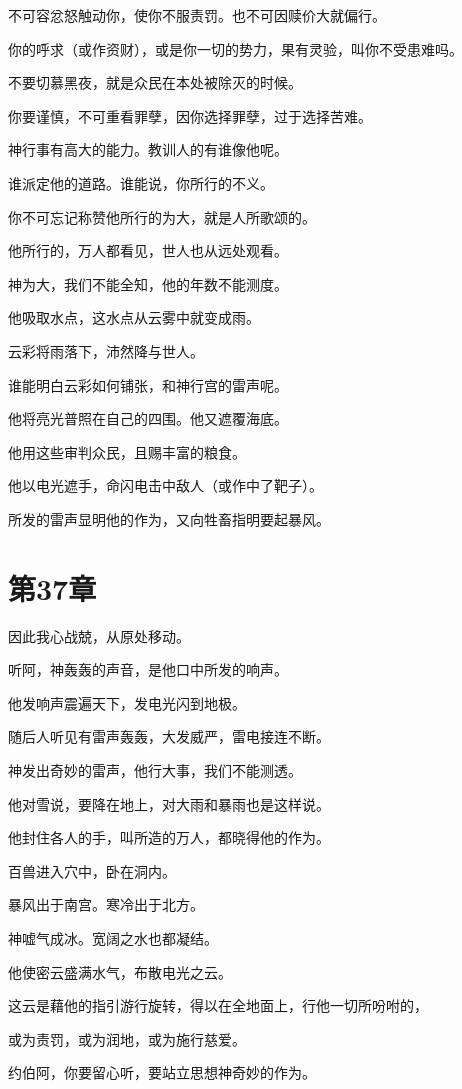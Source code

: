 \documentclass[12pt,oneside]{book}
\begin{document}
不可容忿怒触动你，使你不服责罚。也不可因赎价大就偏行。

你的呼求（或作资财），或是你一切的势力，果有灵验，叫你不受患难吗。

不要切慕黑夜，就是众民在本处被除灭的时候。

你要谨慎，不可重看罪孽，因你选择罪孽，过于选择苦难。

神行事有高大的能力。教训人的有谁像他呢。

谁派定他的道路。谁能说，你所行的不义。

你不可忘记称赞他所行的为大，就是人所歌颂的。

他所行的，万人都看见，世人也从远处观看。

神为大，我们不能全知，他的年数不能测度。

他吸取水点，这水点从云雾中就变成雨。

云彩将雨落下，沛然降与世人。

谁能明白云彩如何铺张，和神行宫的雷声呢。

他将亮光普照在自己的四围。他又遮覆海底。

他用这些审判众民，且赐丰富的粮食。

他以电光遮手，命闪电击中敌人（或作中了靶子）。

所发的雷声显明他的作为，又向牲畜指明要起暴风。


\chapter{第37章}
因此我心战兢，从原处移动。

听阿，神轰轰的声音，是他口中所发的响声。

他发响声震遍天下，发电光闪到地极。

随后人听见有雷声轰轰，大发威严，雷电接连不断。

神发出奇妙的雷声，他行大事，我们不能测透。

他对雪说，要降在地上，对大雨和暴雨也是这样说。

他封住各人的手，叫所造的万人，都晓得他的作为。

百兽进入穴中，卧在洞内。

暴风出于南宫。寒冷出于北方。

神嘘气成冰。宽阔之水也都凝结。

他使密云盛满水气，布散电光之云。

这云是藉他的指引游行旋转，得以在全地面上，行他一切所吩咐的，

或为责罚，或为润地，或为施行慈爱。

约伯阿，你要留心听，要站立思想神奇妙的作为。
\end{document}
